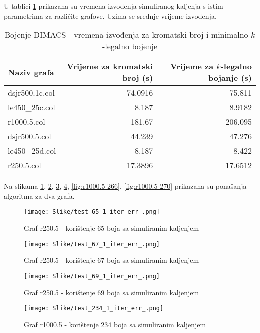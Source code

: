 \documentclass[times, utf8, diplomski, numeric]{fer}
\begin{document}
U tablici \ref{tbl:dimacs-sa-time} prikazana su vremena izvođenja simuliranog kaljenja s istim parametrima za različite grafove. Uzima se srednje vrijeme izvođenja.

\begin{table}[htb]
	\caption{Bojenje DIMACS - vremena izvođenja za kromatski broj i minimalno $k$-legalno bojenje}
	\label{tbl:dimacs-sa-time}
	\centering
	\begin{tabular}{|l||r|r|} \hline
	Naziv grafa & Vrijeme za kromatski broj (s) & Vrijeme za $k$-legalno bojanje (s) \\ \hline \hline
	dsjr500.1c.col & 74.0916 & 75.811 \\ \hline 
	le450\_25c.col & 8.187 & 8.9182 \\  \hline
	r1000.5.col & 181.67 & 206.095 \\ \hline
	dsjr500.5.col & 44.239 & 47.276  \\  \hline 
	le450\_25d.col &  8.187 & 8.422  \\ \hline
	r250.5.col & 17.3896 & 17.6512 \\ \hline
	\end{tabular}
\end{table}

Na slikama \ref{fig:r250.5-65}, \ref{fig:r250.5-67}, \ref{fig:r250.5-69}, \ref{fig:r1000.5-234}, \ref{fig:r1000.5-266}, \ref{fig:r1000.5-270} prikazana su ponašanja algoritma za dva grafa.

\begin{figure}[H]
	\texttt{[image: Slike/test\_65\_1\_iter\_err\_.png]}
	\caption{Graf r250.5 - korištenje $65$ boja sa simuliranim kaljenjem}
	\label{fig:r250.5-65}
\end{figure}

\begin{figure}[H]
	\texttt{[image: Slike/test\_67\_1\_iter\_err\_.png]}
	\caption{Graf r250.5 - korištenje $67$ boja sa simuliranim kaljenjem}
	\label{fig:r250.5-67}
\end{figure}

\begin{figure}[H]
	\texttt{[image: Slike/test\_69\_1\_iter\_err\_.png]}
	\caption{Graf r250.5 - korištenje $69$ boja sa simuliranim kaljenjem}
	\label{fig:r250.5-69}
\end{figure}


\begin{figure}[H]
	\texttt{[image: Slike/test\_234\_1\_iter\_err\_.png]}
	\caption{Graf r1000.5 - korištenje $234$ boja sa simuliranim kaljenjem}
	\label{fig:r1000.5-234}
\end{figure}
\end{document}
